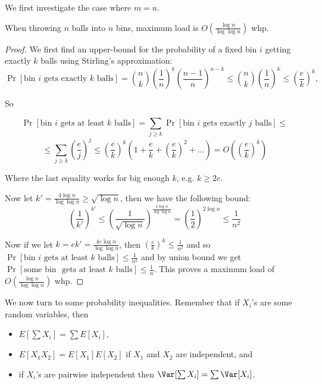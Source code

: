We first investigate the case where $m = n$. 
\begin{proposition} When throwing $n$ balls into $n$ bins, maximum load is $O(\frac{\log n}{\log \log n})$ whp.
\end{proposition} 
\begin{proof}
We first find an upper-bound for the probability of a fixed bin $i$ getting exactly $k$ balls using Stirling's approximation:
$$\Pr[\text{bin } i \text{ gets exactly } k \text{ balls}] = \binom{n}{k} \left( \frac{1}{n}\right)^k \left( \frac{n-1}{n}\right)^{n-k} \leq \binom{n}{k} \left( \frac{1}{n}\right)^k \leq \left( \frac{e}{k} \right)^k,$$

So 

$$\Pr[\text{bin } i \text{ gets at least } k \text{ balls}] = \sum_{j \geq k} \Pr[\text{bin } i \text{ gets exactly } j \text{ balls}] \leq$$
$$ \leq
\sum_{j \geq k} \left( \frac{e}{j} \right)^j  \leq \left( \frac{e}{k}\right)^k \left( 1 + \frac{e}{k} + \left(\frac{e}{k} \right)^2 + \ldots \right) = O\left( \left( \frac{e}{k} \right)^k \right)
$$

Where the last equality works for big enough $k$, e.g. $k \geq 2 e$.

Now let $k' = \frac{4 \log n}{\log \log n} \geq \sqrt{\log n}$, then we have the following bound:
$$
\left( \frac{1}{k'} \right)^{k'} \leq \left( \frac{1}{\sqrt{\log n}} \right)^{\frac{4 \log n}{\log \log n}} = \left( \frac{1}{2} \right) ^{2 \log n} \leq \frac{1}{n^2}
$$

Now if we let $k = e k' = \frac{4 e \log n}{\log \log n}$, then $\left( \frac{e}{k}\right)^k \leq \frac{1}{n^2}$ and so $\Pr[\text{bin } i \text{ gets at least } k \text{ balls}] \leq \frac{1}{n^2}$ and by union bound we get $\Pr[\text{some bin } \text{ gets at least } k \text{ balls}] \leq \frac{1}{n}$. This proves a maximum load of $O\left( \frac{\log n}{\log \log n} \right)$ whp.

\end{proof}

We now turn to some probability inequalities. Remember that if $X_i$'s are some random variables, then
\begin{itemize}
\item $E[\sum X_i] = \sum E[X_i]$,
\item $E[X_1 X_2] = E[X_1] E[X_2]$ if $X_1$ and $X_2$ are independent, and
\item if $X_i$'s are pairwise independent then $\Var [\sum X_i] = \sum \Var [X_i]$.
\end{itemize}

